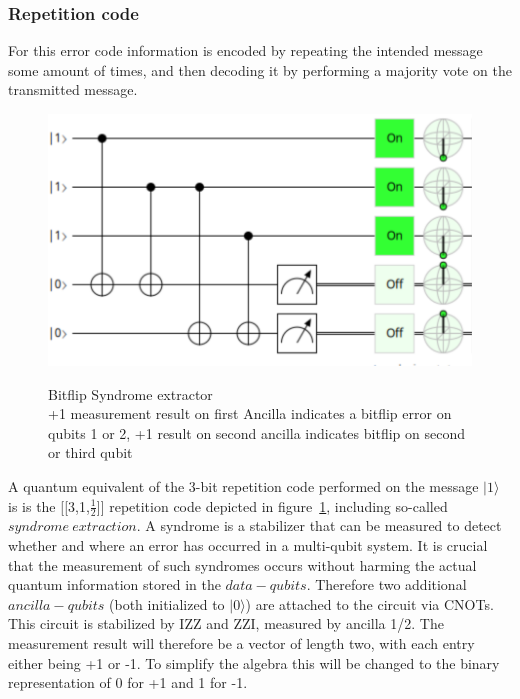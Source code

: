 \subsubsection{Repetition code}
For this error code information is encoded by repeating the 
intended message some amount of times, and then decoding it
by performing a majority vote on the transmitted message.


\begin{figure}[h!]
	\begin{center}
	\captionsetup{justification=centering,margin=2cm}
	\includegraphics[scale=0.2]{./img/bitflipSyndromeExtraction3Rep.png}\\
	\caption{Bitflip Syndrome extractor\\
        +1 measurement result on first Ancilla indicates a bitflip error
        on qubits 1 or 2, +1 result on second ancilla indicates 
		bitflip on second or third qubit}
	\label{fig: syndrome extractor}
	\end{center}
\end{figure}

A quantum equivalent of the 3-bit repetition code performed on
the message $|1\rangle$ is is the [[3,1,$\frac{1}{2}$]] repetition
code depicted in 
figure~\ref{fig: syndrome extractor}, including so-called
$syndrome\ extraction$. A syndrome is a stabilizer that can be
measured to detect whether and where an error has occurred
in a multi-qubit system. It is crucial that the 
measurement of such syndromes occurs without harming the actual
quantum information stored in the $data-qubits$. Therefore
two additional $ancilla-qubits$ (both initialized to 
$|0\rangle$) are attached to the circuit via CNOTs.
This circuit is stabilized by IZZ and ZZI, measured by ancilla 
1/2. The measurement result will therefore be a vector of length
two, with each entry either being +1 or -1. To simplify the 
algebra this will be changed to the binary representation of 0 
for +1 and 1 for -1. 

